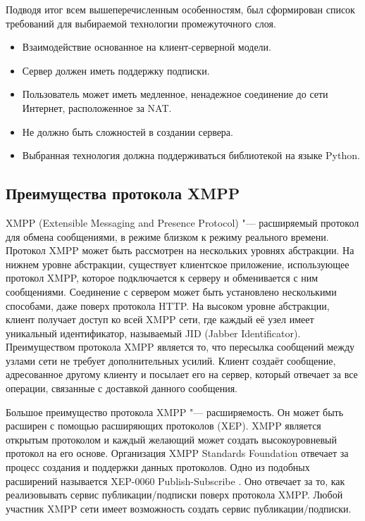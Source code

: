 Подводя итог всем вышеперечисленным особенностям, был сформирован список
требований для выбираемой технологии промежуточного слоя.
\begin{itemize}
\item Взаимодействие основанное на клиент-серверной модели.
\item Сервер должен иметь поддержку подписки.
\item Пользователь может иметь медленное, ненадежное соединение до
сети Интернет, расположенное за NAT.
\item Не должно быть сложностей в создании сервера.
\item Выбранная технология должна поддерживаться библиотекой на языке
Python.
\end{itemize}

\subsection{Преимущества протокола XMPP}

XMPP (Extensible Messaging and Presence Protocol) "--- расширяемый протокол для
обмена сообщениями, в режиме близком к режиму реального времени. Протокол XMPP
может быть рассмотрен на нескольких уровнях абстракции. На нижнем уровне
абстракции, существует клиентское приложение, использующее протокол XMPP,
которое подключается к серверу и обменивается с ним сообщениями. Соединение с
сервером может быть установлено несколькими способами, даже поверх протокола
HTTP. На высоком уровне абстракции, клиент получает доступ ко всей XMPP сети,
где каждый её узел имеет уникальный идентификатор, называемый JID (Jabber
Identificator). Преимуществом протокола XMPP является то, что пересылка
сообщений между узлами сети не требует дополнительных усилий. Клиент создаёт
сообщение, адресованное другому клиенту и посылает его на сервер, который
отвечает за все операции, связанные с доставкой данного сообщения.

Большое преимущество протокола XMPP "--- расширяемость. Он может быть расширен с
помощью расширяющих протоколов (XEP). XMPP является открытым протоколом и каждый
желающий может создать высокоуровневый протокол на его основе. Организация XMPP
Standards Foundation отвечает за процесс создания и поддержки данных протоколов.
Одно из подобных расширений называется XEP-0060 Publish-Subscribe
\cite{xep-0060}. Оно отвечает за то, как реализовывать сервис
публикации/подписки поверх протокола XMPP. Любой участник XMPP сети имеет
возможность создать сервис публикации/подписки.

